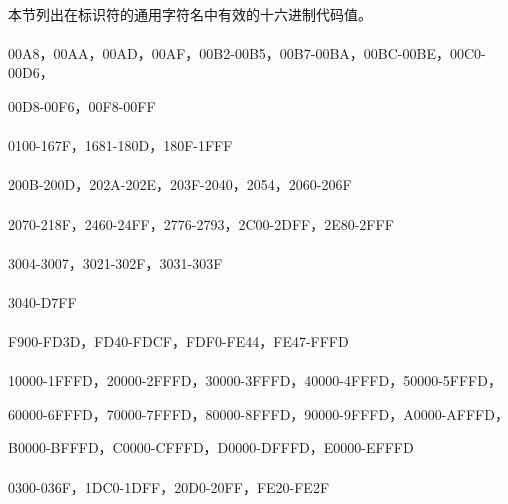 
\paragraph{}
本节列出在标识符的通用字符名中有效的十六进制代码值。

\paragraph{}
00A8，00AA，00AD，00AF，00B2-00B5，00B7-00BA，00BC-00BE，00C0-00D6，

\hspace{2.5em}00D8-00F6，00F8-00FF

\paragraph{}
0100-167F，1681-180D，180F-1FFF

\paragraph{}
200B-200D，202A-202E，203F-2040，2054，2060-206F

\paragraph{}
2070-218F，2460-24FF，2776-2793，2C00-2DFF，2E80-2FFF

\paragraph{}
3004-3007，3021-302F，3031-303F

\paragraph{}
3040-D7FF

\paragraph{}
F900-FD3D，FD40-FDCF，FDF0-FE44，FE47-FFFD

\paragraph{}
10000-1FFFD，20000-2FFFD，30000-3FFFD，40000-4FFFD，50000-5FFFD，

\hspace{2.5em}60000-6FFFD，70000-7FFFD，80000-8FFFD，90000-9FFFD，A0000-AFFFD，

\hspace{2.5em}B0000-BFFFD，C0000-CFFFD，D0000-DFFFD，E0000-EFFFD

\paragraph{}
0300-036F，1DC0-1DFF，20D0-20FF，FE20-FE2F
